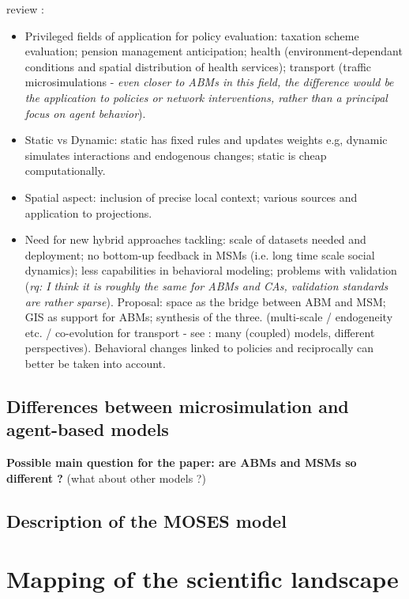 \cite{birkin2012review} review :
\begin{itemize}
    \item Privileged fields of application for policy evaluation: taxation scheme evaluation; pension management anticipation; health (environment-dependant conditions and spatial distribution of health services); transport (traffic microsimulations - \textit{even closer to ABMs in this field, the difference would be the application to policies or network interventions, rather than a principal focus on agent behavior}).
    \item Static vs Dynamic: static has fixed rules and updates weights e.g, dynamic simulates interactions and endogenous changes; static is cheap computationally.
    \item Spatial aspect: inclusion of precise local context; various sources and application to projections.
    \item Need for new hybrid approaches tackling: scale of datasets needed and deployment; no bottom-up feedback in MSMs (i.e. long time scale social dynamics); less capabilities in behavioral modeling; problems with validation (\textit{rq: I think it is roughly the same for ABMs and CAs, validation standards are rather sparse}). Proposal: space as the bridge between ABM and MSM; GIS as support for ABMs; synthesis of the three. (multi-scale / endogeneity etc. / co-evolution for transport - see \cite{batty2019causality} : many (coupled) models, different perspectives). Behavioral changes linked to policies and reciprocally can better be taken into account.
\end{itemize}


\subsection{Differences between microsimulation and agent-based models}

\textbf{Possible main question for the paper: are ABMs and MSMs so different ?} (what about other models ?)





\subsection{Description of the MOSES model}






\section{Mapping of the scientific landscape}

